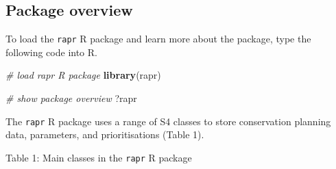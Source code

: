 \documentclass[11pt,]{article}
\newenvironment{Shaded}{\begin{snugshade}}{\end{snugshade}}
\newcommand{\KeywordTok}[1]{\textcolor[rgb]{0.13,0.29,0.53}{\textbf{{#1}}}}
\newcommand{\CommentTok}[1]{\textcolor[rgb]{0.56,0.35,0.01}{\textit{{#1}}}}
\newcommand{\NormalTok}[1]{{#1}}
\begin{document}
\subsection{Package overview}\label{package-overview}

To load the \texttt{rapr} R package and learn more about the package,
type the following code into R.

\begin{Shaded}
\begin{Highlighting}[]
\CommentTok{# load rapr R package}
\KeywordTok{library}\NormalTok{(rapr)}

\CommentTok{# show package overview}
\NormalTok{?rapr}
\end{Highlighting}
\end{Shaded}

The \texttt{rapr} R package uses a range of S4 classes to store
conservation planning data, parameters, and prioritisations (Table 1).

Table 1: Main classes in the \texttt{rapr} R package
\end{document}
